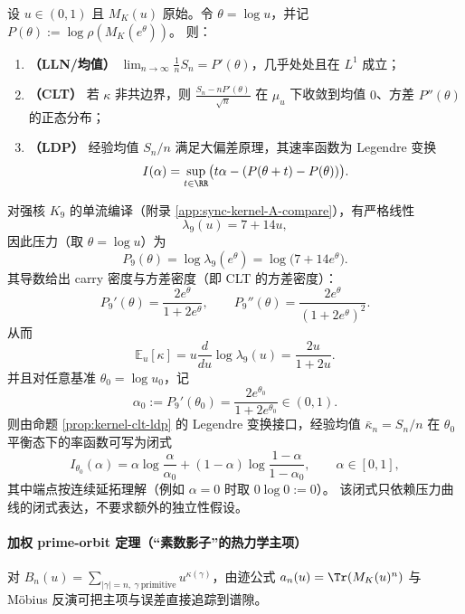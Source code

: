 \begin{proposition}\label{prop:kernel-clt-ldp}
设 $u\in(0,1)$ 且 $M_K(u)$ 原始。令 $\theta=\log u$，并记
\(
P(\theta):=\log\rho(M_K(e^\theta))
\)。
则：
\begin{enumerate}
  \item \textbf{（LLN/均值）} $\lim_{n\to\infty}\frac{1}{n}S_n=P'(\theta)$，几乎处处且在 $L^1$ 成立；
  \item \textbf{（CLT）} 若 $\kappa$ 非共边界，则
  \(
  \frac{S_n-nP'(\theta)}{\sqrt{n}}
  \)
  在 $\mu_u$ 下收敛到均值 $0$、方差 $P''(\theta)$ 的正态分布；
  \item \textbf{（LDP）} 经验均值 $S_n/n$ 满足大偏差原理，其速率函数为 Legendre 变换
  \[
  I(\alpha)=\sup_{t\in\RR}\bigl(t\alpha-(P(\theta+t)-P(\theta))\bigr).
  \]
\end{enumerate}
\end{proposition}

\begin{corollary}\label{cor:k9-integrable-pressure-ldp}
对强核 \(K_9\) 的单流编译（附录 \ref{app:sync-kernel-A-compare}），有严格线性
$$
\lambda_9(u)=7+14u,
$$
因此压力（取 \(\theta=\log u\)）为
$$
P_9(\theta)=\log\lambda_9(e^\theta)=\log\!\bigl(7+14e^\theta\bigr).
$$
其导数给出 carry 密度与方差密度（即 CLT 的方差密度）：
$$
P_9'(\theta)=\frac{2e^\theta}{1+2e^\theta},\qquad
P_9''(\theta)=\frac{2e^\theta}{(1+2e^\theta)^2}.
$$
从而
$$
\mathbb{E}_{u}[\kappa]=u\frac{d}{du}\log\lambda_9(u)=\frac{2u}{1+2u}.
$$
并且对任意基准 \(\theta_0=\log u_0\)，记
$$
\alpha_0:=P_9'(\theta_0)=\frac{2e^{\theta_0}}{1+2e^{\theta_0}}\in(0,1).
$$
则由命题 \ref{prop:kernel-clt-ldp} 的 Legendre 变换接口，经验均值 \(\bar\kappa_n=S_n/n\) 在 \(\theta_0\) 平衡态下的率函数可写为闭式
$$
I_{\theta_0}(\alpha)
=\alpha\log\frac{\alpha}{\alpha_0}+(1-\alpha)\log\frac{1-\alpha}{1-\alpha_0},
\qquad \alpha\in[0,1],
$$
其中端点按连续延拓理解（例如 \(\alpha=0\) 时取 \(0\log 0:=0\)）。
该闭式只依赖压力曲线的闭式表达，不要求额外的独立性假设。
\end{corollary}

\paragraph{加权 prime-orbit 定理（“素数影子”的热力学主项）}
对 $B_n(u)=\sum_{|\gamma|=n,\ \gamma\ \mathrm{primitive}}u^{\kappa(\gamma)}$，由迹公式 $a_n(u)=\Tr(M_K(u)^n)$ 与 Möbius 反演可把主项与误差直接追踪到谱隙。

